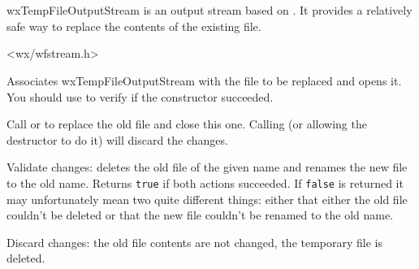 %
%

\section{}\label{wxtempfileoutputstream}

wxTempFileOutputStream is an output stream based on . It
provides a relatively safe way to replace the contents of the
existing file.




<wx/wfstream.h>





\label{wxtempfileoutputstreamwxtempfileoutputstream}


Associates wxTempFileOutputStream with the file to be replaced and opens it. You should use 
 to verify if the constructor succeeded.

Call  or  to
replace the old file and close this one. Calling  
(or allowing the destructor to do it) will discard the changes.


\label{wxtempfileoutputstreamcommit}


Validate changes: deletes the old file of the given name and renames the new
file to the old name. Returns {\tt true} if both actions succeeded. If {\tt false} is
returned it may unfortunately mean two quite different things: either that
either the old file couldn't be deleted or that the new file couldn't be renamed
to the old name.


\label{wxtempfileoutputstreamdiscard}


Discard changes: the old file contents are not changed, the temporary file is
deleted.
